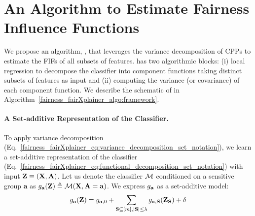 \section{ An Algorithm to Estimate Fairness Influence Functions}\label{fairness_fairXplainer_sec:fairxplainer}
\begin{comment}
Represent the algorithm as a sequence of two blocks: (1) Component function learning (2) Covariance computation of component functions. 
\end{comment}
We propose an algorithm, {\fairXplainer}, that leverages the variance decomposition of CPPs to estimate the FIFs of all subsets of features. {\fairXplainer} has two algorithmic blocks: (i) local regression to decompose the classifier into component functions taking distinct subsets of features as input and (ii) computing the variance (or covariance) of each component function. We describe the schematic of {\fairXplainer} in Algorithm~\ref{fairness_fairXplainer_algo:framework}.
\setlength{\textfloatsep}{12pt}%

\paragraph{A Set-additive Representation of the Classifier.} To apply variance decomposition (Eq.~\eqref{fairness_fairXplainer_eq:variance_decomposition_set_notation}), we learn a set-additive representation of the classifier (Eq.~\eqref{fairness_fairXplainer_eq:functional_decomposition_set_notation}) with input $ \mathbf{Z} \equiv (\mathbf{X}, \mathbf{A}) $. Let us denote the classifier $ \mathcal{M} $ conditioned on a sensitive group $ \mathbf{a} $ as $ g_{\mathbf{a}}(\mathbf{Z}) \triangleq \mathcal{M}(\mathbf{X}, \mathbf{A} = \mathbf{a}) $. We express $ g_{\mathbf{a}} $ as a set-additive model:
\begin{align}
\label{fairness_fairXplainer_eq:set_additive_classifier}
g_{\mathbf{a}}(\mathbf{Z}) = g_{\mathbf{a}, 0} +  \sum_{\mathbf{S} \subseteq [m] , |\mathbf{S}| \le \lambda} g_{\mathbf{a},\mathbf{S}}(\mathbf{Z}_{\mathbf{S}}) + \delta
\end{align}

